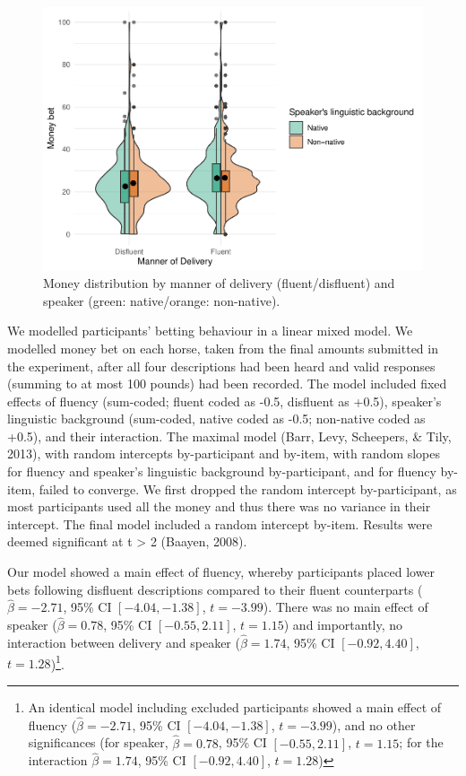 \documentclass[
  man,floatsintext]{apa7}
\begin{document}
\begin{figure}[H]

{\centering \includegraphics[width=0.9\linewidth,]{manuscript_eb_files/figure-latex/fig1-1} 

}

\caption{Money distribution by manner of delivery (fluent/disfluent) and speaker (green: native/orange: non-native).}\label{fig:fig1}
\end{figure}

We modelled participants' betting behaviour in a linear mixed model. We modelled money bet on each horse, taken from the final amounts submitted in the experiment, after all four descriptions had been heard and valid responses (summing to at most 100 pounds) had been recorded. The model included fixed effects of fluency (sum-coded; fluent coded as -0.5, disfluent as +0.5), speaker's linguistic background (sum-coded, native coded as -0.5; non-native coded as +0.5), and their interaction. The maximal model (Barr, Levy, Scheepers, \& Tily, 2013), with random intercepts by-participant and by-item, with random slopes for fluency and speaker's linguistic background by-participant, and for fluency by-item, failed to converge. We first dropped the random intercept by-participant, as most participants used all the money and thus there was no variance in their intercept. The final model included a random intercept by-item. Results were deemed significant at \textbar t\textbar{} \textgreater{} 2 (Baayen, 2008).

Our model showed a main effect of fluency, whereby participants placed lower bets following disfluent descriptions compared to their fluent counterparts (\(\hat{\beta} = -2.71\), 95\% CI \([-4.04, -1.38]\), \(t = -3.99\)). There was no main effect of speaker (\(\hat{\beta} = 0.78\), 95\% CI \([-0.55, 2.11]\), \(t = 1.15\)) and importantly, no interaction between delivery and speaker (\(\hat{\beta} = 1.74\), 95\% CI \([-0.92, 4.40]\), \(t = 1.28\))\footnote{An identical model including excluded participants showed a main effect of fluency (\(\hat{\beta} = -2.71\), 95\% CI \([-4.04, -1.38]\), \(t = -3.99\)), and no other significances (for speaker, \(\hat{\beta} = 0.78\), 95\% CI \([-0.55, 2.11]\), \(t = 1.15\); for the interaction \(\hat{\beta} = 1.74\), 95\% CI \([-0.92, 4.40]\), \(t = 1.28\))}.
\end{document}
